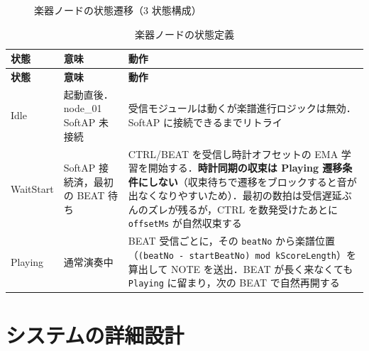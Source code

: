 \documentclass[lualatex,book,paper=a4paper,jafontsize=11.5pt,jafontscale=1.05]{jlreq}
\begin{document}
\begin{figure}[H]
\centering
{}
\caption{楽器ノードの状態遷移（3 状態構成）}\label{fig:state-performer}
\end{figure}

\begin{longtable}{p{} p{} p{}}
\caption{楽器ノードの状態定義}\label{tab:state-performer}\\
\toprule
\textbf{状態} & \textbf{意味} & \textbf{動作} \\
\midrule
\endfirsthead
\toprule
\textbf{状態} & \textbf{意味} & \textbf{動作} \\
\midrule
\endhead
Idle      & 起動直後．node\_01 SoftAP 未接続 & 受信モジュールは動くが楽譜進行ロジックは無効．SoftAP に接続できるまでリトライ \\
WaitStart & SoftAP 接続済，最初の BEAT 待ち & CTRL/BEAT を受信し時計オフセットの EMA 学習を開始する．\textbf{時計同期の収束は Playing 遷移条件にしない}（収束待ちで遷移をブロックすると音が出なくなりやすいため）．最初の数拍は受信遅延ぶんのズレが残るが，CTRL を数発受けたあとに \texttt{offsetMs} が自然収束する \\
Playing   & 通常演奏中                 & BEAT 受信ごとに，その \texttt{beatNo} から楽譜位置（\texttt{(beatNo - startBeatNo) mod kScoreLength}）を算出して NOTE を送出．BEAT が長く来なくても \texttt{Playing} に留まり，次の BEAT で自然再開する \\
\bottomrule
\end{longtable}


\chapter{システムの詳細設計}\label{chap:detail}
\end{document}
